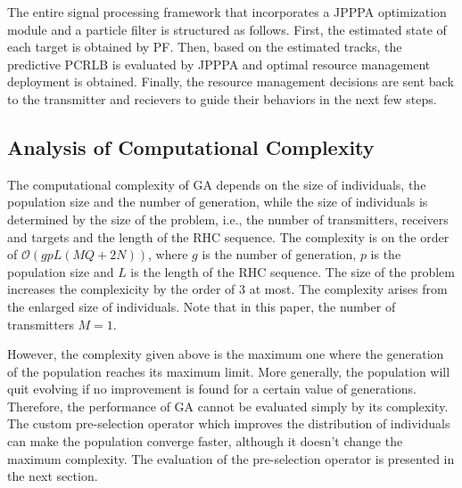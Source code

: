 \documentclass[12pt,journal,draftclsnofoot,onecolumn]{IEEEtran}
\begin{document}
The entire signal processing framework that incorporates a JPPPA optimization module and a particle filter is structured as follows. First, the estimated state of each target is obtained by PF. Then, based on the estimated tracks, the predictive PCRLB is evaluated by JPPPA and optimal resource management deployment is obtained. Finally, the resource management decisions are sent back to the transmitter and recievers to guide their behaviors in the next few steps.

\subsection{Analysis of Computational Complexity}
The computational complexity of GA depends on the size of individuals, the population size and the number of generation, while the size of individuals is determined by the size of the problem, i.e., the number of transmitters, receivers and targets and the length of the RHC sequence. The complexity is on the order of $\mathcal{O}(gpL(MQ+2N))$, where $g$ is the number of generation, $p$ is the population size and $L$ is the length of the RHC sequence. The size of the problem increases the complexicity by the order of 3 at most. The complexity arises from the enlarged size of individuals. Note that in this paper, the number of transmitters $M=1$. 


However, the complexity given above is the maximum one where the generation of the population reaches its maximum limit. More generally, the population will quit evolving if no improvement is found for a certain value of generations. Therefore, the performance of GA cannot be evaluated simply by its complexity. The custom pre-selection operator which improves the distribution of individuals can make the population converge faster, although it doesn't change the maximum complexity. The evaluation of the pre-selection operator is presented in the next section.
\end{document}

